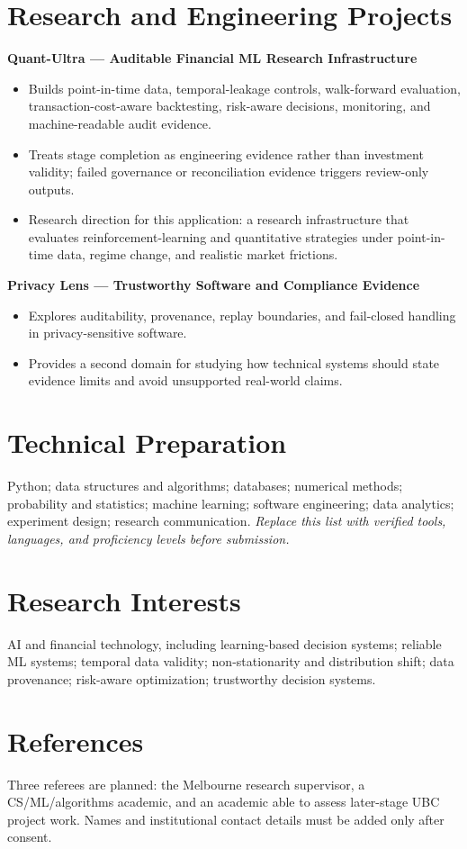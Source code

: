 \documentclass[11pt]{article}
\begin{document}
\section*{Research and Engineering Projects}
\textbf{Quant-Ultra --- Auditable Financial ML Research Infrastructure}
\begin{itemize}
\item Builds point-in-time data, temporal-leakage controls, walk-forward evaluation, transaction-cost-aware backtesting, risk-aware decisions, monitoring, and machine-readable audit evidence.
\item Treats stage completion as engineering evidence rather than investment validity; failed governance or reconciliation evidence triggers review-only outputs.
\item Research direction for this application: a research infrastructure that evaluates reinforcement-learning and quantitative strategies under point-in-time data, regime change, and realistic market frictions.
\end{itemize}

\begin{samepage}
\textbf{Privacy Lens --- Trustworthy Software and Compliance Evidence}
\begin{itemize}
\item Explores auditability, provenance, replay boundaries, and fail-closed handling in privacy-sensitive software.
\item Provides a second domain for studying how technical systems should state evidence limits and avoid unsupported real-world claims.
\end{itemize}
\end{samepage}

\section*{Technical Preparation}
Python; data structures and algorithms; databases; numerical methods; probability and statistics; machine learning; software engineering; data analytics; experiment design; research communication. \textit{Replace this list with verified tools, languages, and proficiency levels before submission.}

\section*{Research Interests}
AI and financial technology, including learning-based decision systems; reliable ML systems; temporal data validity; non-stationarity and distribution shift; data provenance; risk-aware optimization; trustworthy decision systems.

\section*{References}
Three referees are planned: the Melbourne research supervisor, a CS/ML/algorithms academic, and an academic able to assess later-stage UBC project work. Names and institutional contact details must be added only after consent.
\end{document}
